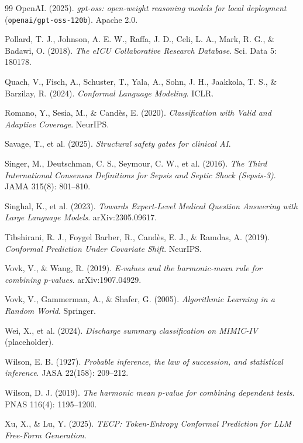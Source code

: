 \documentclass[11pt,letterpaper]{article}
\begin{document}
\begin{thebibliography}{99}
 OpenAI. (2025). \emph{gpt-oss: open-weight reasoning
models for local deployment} (\texttt{openai/gpt-oss-120b}). Apache 2.0.

 Pollard, T. J., Johnson, A. E. W., Raffa, J. D.,
Celi, L. A., Mark, R. G., \& Badawi, O. (2018). \emph{The eICU Collaborative
Research Database}. Sci. Data 5: 180178.

 Quach, V., Fisch, A., Schuster, T., Yala, A., Sohn,
J. H., Jaakkola, T. S., \& Barzilay, R. (2024). \emph{Conformal Language
Modeling}. ICLR.

 Romano, Y., Sesia, M., \& Cand\`es, E. (2020).
\emph{Classification with Valid and Adaptive Coverage}. NeurIPS.

 Savage, T., et al. (2025). \emph{Structural safety
gates for clinical AI}.

 Singer, M., Deutschman, C. S., Seymour, C. W.,
et al. (2016). \emph{The Third International Consensus Definitions for
Sepsis and Septic Shock (Sepsis-3)}. JAMA 315(8): 801--810.

 Singhal, K., et al. (2023). \emph{Towards Expert-Level
Medical Question Answering with Large Language Models}. arXiv:2305.09617.

 Tibshirani, R. J., Foygel Barber, R., Cand\`es,
E. J., \& Ramdas, A. (2019). \emph{Conformal Prediction Under Covariate
Shift}. NeurIPS.

 Vovk, V., \& Wang, R. (2019). \emph{E-values
and the harmonic-mean rule for combining p-values}. arXiv:1907.04929.

 Vovk, V., Gammerman, A., \& Shafer, G. (2005).
\emph{Algorithmic Learning in a Random World}. Springer.

 Wei, X., et al. (2024). \emph{Discharge summary
classification on MIMIC-IV} (placeholder).

 Wilson, E. B. (1927). \emph{Probable inference, the
law of succession, and statistical inference}. JASA 22(158): 209--212.

 Wilson, D. J. (2019). \emph{The harmonic mean
$p$-value for combining dependent tests}. PNAS 116(4): 1195--1200.

 Xu, X., \& Lu, Y. (2025). \emph{TECP: Token-Entropy
Conformal Prediction for LLM Free-Form Generation}.

\end{thebibliography}
\end{document}
